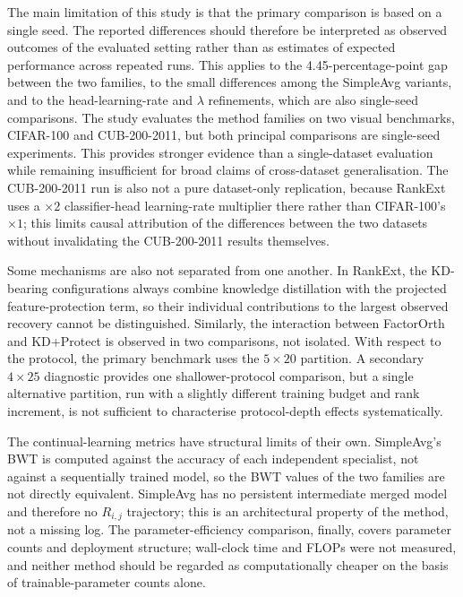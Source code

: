 The main limitation of this study is that the primary comparison is based
on a single seed. The reported differences should therefore be interpreted
as observed outcomes of the evaluated setting rather than as estimates of
expected performance across repeated runs. This applies to the
4.45-percentage-point gap between the two families, to the small
differences among the SimpleAvg variants, and to the head-learning-rate and
$\lambda$ refinements, which are also single-seed comparisons. The study
evaluates the method families on two visual benchmarks, CIFAR-100 and
CUB-200-2011, but both principal comparisons are single-seed experiments.
This provides stronger evidence than a single-dataset evaluation while
remaining insufficient for broad claims of cross-dataset generalisation.
The CUB-200-2011 run is also not a pure dataset-only replication, because
RankExt uses a $\times2$ classifier-head learning-rate multiplier there
rather than CIFAR-100's $\times1$; this limits causal attribution of the
differences between the two datasets without invalidating the CUB-200-2011
results themselves.

Some mechanisms are also not separated from one another. In RankExt, the
KD-bearing configurations always combine knowledge distillation with the
projected feature-protection term, so their individual contributions to the
largest observed recovery cannot be distinguished. Similarly, the
interaction between FactorOrth and KD+Protect is observed in two
comparisons, not isolated. With respect to the protocol, the primary
benchmark uses the $5\times20$ partition. A secondary $4\times25$
diagnostic provides one shallower-protocol comparison, but a single
alternative partition, run with a slightly different training budget and
rank increment, is not sufficient to characterise protocol-depth effects
systematically.

The continual-learning metrics have structural limits of their own.
SimpleAvg's BWT is computed against the accuracy of each independent
specialist, not against a sequentially trained model, so the BWT values of
the two families are not directly equivalent. SimpleAvg has no persistent
intermediate merged model and therefore no $R_{i,j}$ trajectory; this is an
architectural property of the method, not a missing log. The
parameter-efficiency comparison, finally, covers parameter counts and
deployment structure; wall-clock time and FLOPs were not measured, and
neither method should be regarded as computationally cheaper on the basis
of trainable-parameter counts alone.

